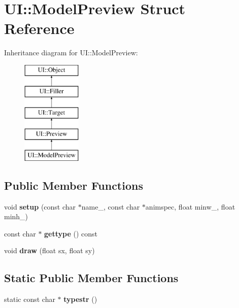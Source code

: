 \hypertarget{struct_u_i_1_1_model_preview}{}\section{UI\+:\+:Model\+Preview Struct Reference}
\label{struct_u_i_1_1_model_preview}
Inheritance diagram for UI\+:\+:Model\+Preview\+:\begin{figure}[H]
\begin{center}
\leavevmode
\includegraphics[height=5.000000cm]{struct_u_i_1_1_model_preview}
\end{center}
\end{figure}
\subsection*{Public Member Functions}
\begin{DoxyCompactItemize}
\item 
\mbox{\label{struct_u_i_1_1_model_preview_a8f5c1c00dc13110ec239e7cffb2846ff}} 
void {\bfseries setup} (const char $\ast$name\+\_\+, const char $\ast$animspec, float minw\+\_\+, float minh\+\_\+)
\item 
\mbox{\label{struct_u_i_1_1_model_preview_a359034dd89b322659e91213465429c7b}} 
const char $\ast$ {\bfseries gettype} () const
\item 
\mbox{\label{struct_u_i_1_1_model_preview_a12ac64b47b88d331720a5bd12547d9da}} 
void {\bfseries draw} (float sx, float sy)
\end{DoxyCompactItemize}
\subsection*{Static Public Member Functions}
\begin{DoxyCompactItemize}
\item 
\mbox{\label{struct_u_i_1_1_model_preview_aa964f133ac52972293d15cf7057f1652}} 
static const char $\ast$ {\bfseries typestr} ()
\end{DoxyCompactItemize}
